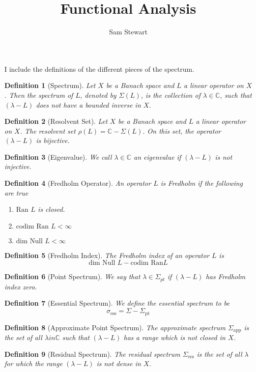 \documentclass[12pt,letterpaper,boxed]{jhwhw}
\author{Sam Stewart}
\title{Functional Analysis}
\newtheorem{definition}{Definition}
\newcommand{\C}{{\mathbb{C}}}
\begin{document}
I include the definitions of the different pieces of the spectrum.

\begin{definition}[Spectrum]
	Let $X$ be a Banach space and $L$ a linear operator on $X$. Then the spectrum of $L$, denoted by $\Sigma\left( L \right)$, is the collection of $\lambda \in \C$, such that $(\lambda - L)$ does not have a bounded inverse in $X$.
\end{definition}

\begin{definition}[Resolvent Set]
	Let $X$ be a Banach space and $L$ a linear operator on $X$. The resolvent set $\rho(L) = \C - \Sigma\left( L \right)$. On this set, the operator $(\lambda - L)$ is bijective.
\end{definition}

\begin{definition}[Eigenvalue]
	We call $\lambda \in \C$ an eigenvalue if $(\lambda - L)$ is not injective.
\end{definition}

\begin{definition}[Fredholm Operator]
	An operator $L$ is Fredholm if the following are true
	\begin{enumerate}
		\item $\textrm{Ran } L$ is closed.
		\item $\textrm{codim Ran } L < \infty$
		\item $\textrm{dim Null } L < \infty$ 
	\end{enumerate}
\end{definition}

\begin{definition}[Fredholm Index]
	The Fredholm index of an operator $L$ is
	\[
		\textrm{dim Null } L - \textrm{codim Ran} L
	\]
\end{definition}

\begin{definition}[Point Spectrum]
	We say that $\lambda \in \Sigma_{pt}$ if $(\lambda - L)$ has Fredholm index zero.
\end{definition}

\begin{definition}[Essential Spectrum]
	We define the essential spectrum to be
	\[
		\sigma_{\textrm{ess}} = \Sigma - \Sigma_{\textrm{pt}}
	\]
\end{definition}

\begin{definition}[Approximate Point Spectrum]
	The approximate spectrum $\Sigma_{\textrm{app}}$ is the set of all $\lambda in \C$ such that $(\lambda - L)$ has a range which is not closed in $X$. 
\end{definition}

\begin{definition}[Residual Spectrum]
	The residual spectrum $\Sigma_{\textrm{res}}$ is the set of all $\lambda$ for which the range $(\lambda - L)$ is not dense in $X$.
\end{definition}
\end{document}
